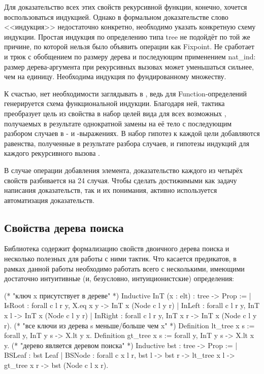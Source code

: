 \documentclass[a4paper,14pt]{extarticle}
\begin{document}
Для доказательство всех этих свойств рекурсивной функции,
конечно, хочется воспользоваться индукцией.
Однако в формальном доказательстве слово <<индукция>>
недостаточно конкретно, необходимо указать конкретную схему индукции.
Простая индукция по определению типа tree не подойдёт
по той же причине, по которой нельзя было объявить
операции как Fixpoint.
Не сработает и трюк с обобщением по размеру дерева и
последующим применением nat\_ind:
размер дерева-аргумента при рекурсивных вызовах
может уменьшаться сильнее, чем на единицу.
Необходима индукция по фундированному множеству.

К счастью, нет необходимости заглядывать в ,
ведь для Function-определений генерируется схема
функциональной индукции.
Благодаря ней, тактика 
преобразует цель из свойства 
в набор целей вида  для
всех возможных ,
получаемых в результате однократной замены 
на её тело с последующим разбором случаев в
- и -выражениях.
В набор гипотез к каждой цели добавляются
равенства, полученные в результате разбора случаев,
и гипотезы индукций для каждого рекурсивного вызова .

В случае операции добавления элемента,
доказательство каждого из четырёх
свойств разбивается на 24 случая.
Чтобы сделать достижимыми как задачу написания доказательств,
так и их понимания,
активно используется автоматизация доказательств.

\subsection{Свойства дерева поиска}

Библиотека  содержит
формализацию свойств двоичного дерева поиска
и несколько полезных для работы с ними тактик.
Что касается предикатов, в рамках данной работы
необходимо работать всего с несколькими,
имеющими достаточно интуитивные (и, безусловно, интуиционистские)
определения:

\begin{coqcode}
(* "ключ x присутствует в дереве" *)
Inductive InT (x : elt) : tree -> Prop :=
  | IsRoot : forall c l r y, X.eq x y
     -> InT x (Node c l y r)
  | InLeft : forall c l r y, InT x l
     -> InT x (Node c l y r)
  | InRight : forall c l r y, InT x r
     -> InT x (Node c l y r).
(* "все ключи из дерева s меньше/больше чем x" *)
Definition lt_tree x s := forall y, InT y s -> X.lt y x.
Definition gt_tree x s := forall y, InT y s -> X.lt x y.
(* "дерево является деревом поиска" *)
Inductive bst : tree -> Prop :=
  | BSLeaf : bst Leaf
  | BSNode : forall c x l r, bst l -> bst r ->
     lt_tree x l -> gt_tree x r -> bst (Node c l x r).
\end{coqcode}
\end{document}
